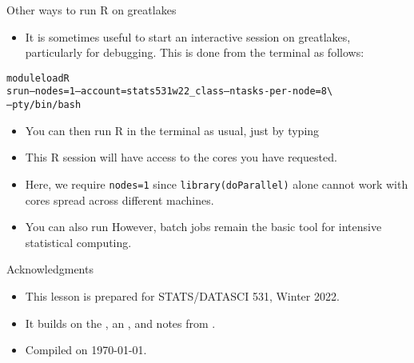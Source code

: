 \begin{frame}[fragile]{Other ways to run R on greatlakes}

\begin{itemize}
\item It is sometimes useful to start an interactive session on greatlakes, particularly for debugging. This is done from the terminal as follows:
\end{itemize}
\begin{knitrout}\small
{}\color{fgcolor}\begin{kframe}
\begin{alltt}
module load R
srun --nodes=1 --account=stats531w22_class --ntasks-per-node=8 \textbackslash{}
  --pty /bin/bash
\end{alltt}
\end{kframe}
\end{knitrout}
\begin{itemize}
\item You can then run R in the terminal as usual, just by typing
\begin{knitrout}\small
{}\color{fgcolor}\begin{kframe}
\begin{alltt}
\end{alltt}
\end{kframe}
\end{knitrout}
\item This R session will have access to the cores you have requested.
\item Here, we require \texttt{nodes=1} since \texttt{library(doParallel)} alone cannot work with cores spread across different machines.
\item You can also run 
However, batch jobs remain the basic tool for intensive statistical computing.
\end{itemize}

\end{frame}


\begin{frame}{Acknowledgments}
  \begin{itemize}
  \item
    This lesson is prepared for STATS/DATASCI 531, Winter 2022.
  \item
    It builds on the , an , and notes from .
\item
    Compiled on \today.

  \end{itemize}

\end{frame}




